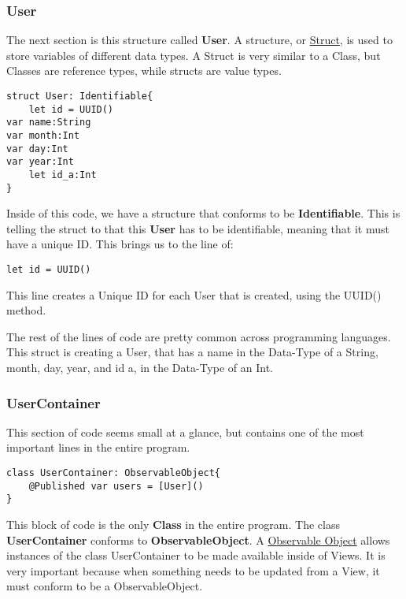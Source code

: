\documentclass{article}
\theoremstyle{theorem}
\theoremstyle{definition}
\theoremstyle{remark}
\begin{document}
\subsubsection{User}
The next section is this structure called \textbf{User}. A structure, or \href{https://www.programiz.com/swift-programming/structs#:~:text=In%20Swift%2C%20a%20struct%20is,same%20information%20of%20multiple%20people.}{Struct}, is used to store variables of different data types. 
\noindent A Struct is very similar to a Class, but Classes are reference types, while structs are value types.
\begin{verbatim}
struct User: Identifiable{
    let id = UUID()
var name:String
var month:Int
var day:Int
var year:Int
    let id_a:Int
}
\end{verbatim}

\noindent\newline Inside of this code, we have a structure that conforms to be \textbf{Identifiable}. This is telling the struct to that this \textbf{User} has to be identifiable, meaning that it must have a unique ID. This brings us to the line of:
\begin{verbatim}
let id = UUID()
\end{verbatim}
This line creates a Unique ID for each User that is created, using the UUID() method. 

\noindent\newline The rest of the lines of code are pretty common across programming languages. This struct is creating a User, that has a name in the Data-Type of a String, month, day, year, and id a, in the Data-Type of an Int. 

\subsubsection{UserContainer}
This section of code seems small at a glance, but contains one of the most important lines in the entire program.
\begin{verbatim}
class UserContainer: ObservableObject{
    @Published var users = [User]()
}
\end{verbatim}
This block of code is the only \textbf{Class} in the entire program. The class \textbf{UserContainer} conforms to \textbf{ObservableObject}. A \href{https://www.hackingwithswift.com/quick-start/swiftui/how-to-use-observedobject-to-manage-state-from-external-objects}{Observable Object} allows instances of the class UserContainer to be made available inside of Views. It is very important because when something needs to be updated from a View, it must conform to be a ObservableObject. 
\end{document}
